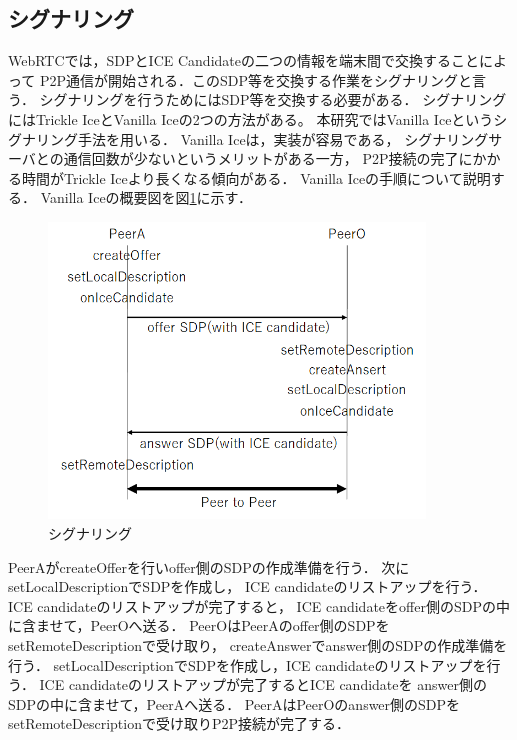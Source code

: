 \documentclass[sotsuron]{jcsie}
\begin{document}
\subsection{シグナリング}
WebRTCでは，SDPとICE Candidateの二つの情報を端末間で交換することによって
P2P通信が開始される．このSDP等を交換する作業をシグナリングと言う．
シグナリングを行うためにはSDP等を交換する必要がある．
シグナリングにはTrickle IceとVanilla Iceの2つの方法がある。
本研究ではVanilla Iceというシグナリング手法を用いる．
Vanilla Iceは，実装が容易である，
シグナリングサーバとの通信回数が少ないというメリットがある一方，
P2P接続の完了にかかる時間がTrickle Iceより長くなる傾向がある．
Vanilla Iceの手順について説明する．
Vanilla Iceの概要図を図\ref{fig:signaling}に示す．
\begin{figure}[H]
	\centering
	\includegraphics[width=10cm]{./assets/image/signaling.png}
	\caption{シグナリング}
	\label{fig:signaling}
\end{figure}
PeerAがcreateOfferを行いoffer側のSDPの作成準備を行う．
次にsetLocalDescriptionでSDPを作成し，
ICE candidateのリストアップを行う．
ICE candidateのリストアップが完了すると，
ICE candidateをoffer側のSDPの中に含ませて，PeerOへ送る．
PeerOはPeerAのoffer側のSDPをsetRemoteDescriptionで受け取り，
createAnswerでanswer側のSDPの作成準備を行う．
setLocalDescriptionでSDPを作成し，ICE candidateのリストアップを行う．
ICE candidateのリストアップが完了するとICE candidateを
answer側のSDPの中に含ませて，PeerAへ送る．
PeerAはPeerOのanswer側のSDPをsetRemoteDescriptionで受け取りP2P接続が完了する．
\end{document}
